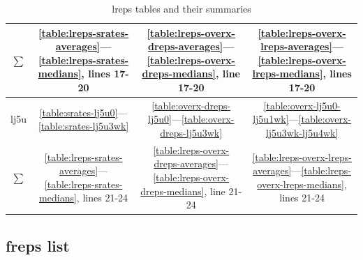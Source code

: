 \documentclass[10pt,oneside]{memoir}
\begin{document}
\begin{table}
\begin{tabular}{|cccc|}
$\sum$ & \ref{table:lreps-srates-averages}—\ref{table:lreps-srates-medians}, lines 17-20 & \ref{table:lreps-overx-dreps-averages}—\ref{table:lreps-overx-dreps-medians}, line 17-20 & \ref{table:lreps-overx-lreps-averages}—\ref{table:lreps-overx-lreps-medians}, lines 17-20  \\
\hline
lj5u & \ref{table:srates-lj5u0}—\ref{table:srates-lj5u3wk} & \ref{table:overx-dreps-lj5u0}—\ref{table:overx-dreps-lj5u3wk} & \ref{table:overx-lj5u0-lj5u1wk}—\ref{table:overx-lj5u3wk-lj5u4wk} \\
$\sum$ & \ref{table:lreps-srates-averages}—\ref{table:lreps-srates-medians}, lines 21-24 & \ref{table:lreps-overx-dreps-averages}—\ref{table:lreps-overx-dreps-medians}, line 21-24 & \ref{table:lreps-overx-lreps-averages}—\ref{table:lreps-overx-lreps-medians}, lines 21-24  \\
\bottomrule
\end{tabular}
\caption{lreps tables and their summaries}
\label{table:lreps-tables}
\end{table}
\pagebreak \subsection{freps list}
\label{frepslist}
\end{document}

